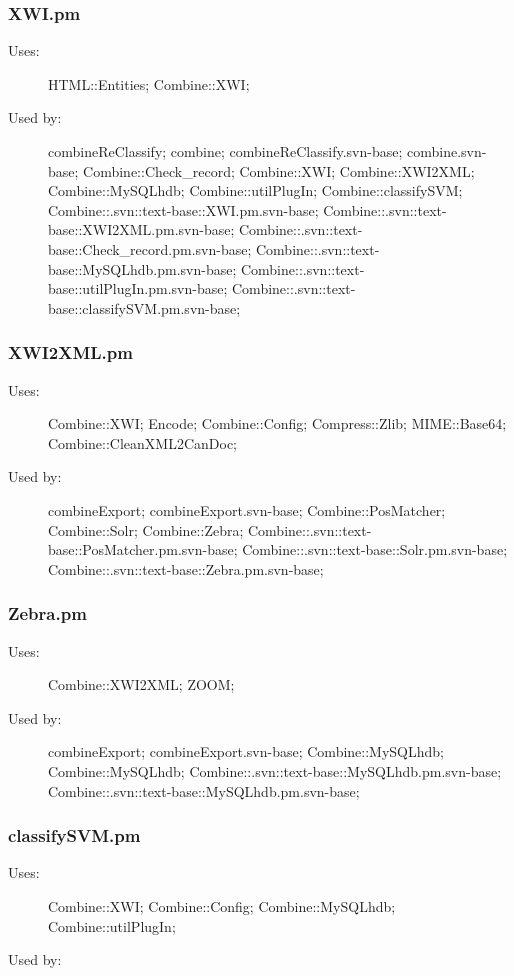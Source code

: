 \subsubsection{XWI.pm}
\begin{description}
\item[Uses:] HTML::Entities; Combine::XWI; 

\item[Used by:] combineReClassify; combine; combineReClassify.svn-base; combine.svn-base; Combine::Check\_record; Combine::XWI; Combine::XWI2XML; Combine::MySQLhdb; Combine::utilPlugIn; Combine::classifySVM; Combine::.svn::text-base::XWI.pm.svn-base; Combine::.svn::text-base::XWI2XML.pm.svn-base; Combine::.svn::text-base::Check\_record.pm.svn-base; Combine::.svn::text-base::MySQLhdb.pm.svn-base; Combine::.svn::text-base::utilPlugIn.pm.svn-base; Combine::.svn::text-base::classifySVM.pm.svn-base; 

\end{description}
\subsubsection{XWI2XML.pm}
\begin{description}
\item[Uses:] Combine::XWI; Encode; Combine::Config; Compress::Zlib; MIME::Base64; Combine::CleanXML2CanDoc; 

\item[Used by:] combineExport; combineExport.svn-base; Combine::PosMatcher; Combine::Solr; Combine::Zebra; Combine::.svn::text-base::PosMatcher.pm.svn-base; Combine::.svn::text-base::Solr.pm.svn-base; Combine::.svn::text-base::Zebra.pm.svn-base; 

\end{description}
\subsubsection{Zebra.pm}
\begin{description}
\item[Uses:] Combine::XWI2XML; ZOOM; 

\item[Used by:] combineExport; combineExport.svn-base; Combine::MySQLhdb; Combine::MySQLhdb; Combine::.svn::text-base::MySQLhdb.pm.svn-base; Combine::.svn::text-base::MySQLhdb.pm.svn-base; 

\end{description}
\subsubsection{classifySVM.pm}
\begin{description}
\item[Uses:] Combine::XWI; Combine::Config; Combine::MySQLhdb; Combine::utilPlugIn; 

\item[Used by:] 

\end{description}
